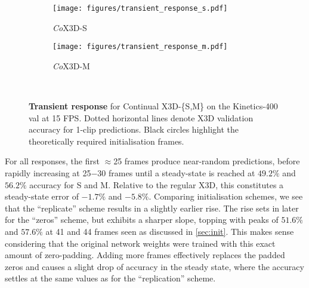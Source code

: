 \begin{figure}[b!]
    \centering
    \begin{subfigure}[b]{0.7\linewidth}
        \centering
        \texttt{[image: figures/transient\_response\_s.pdf]}
        \\[-2ex]
        \caption{\textit{Co}X3D-S}
        \label{fig:transient-s}
    \end{subfigure}
    \begin{subfigure}[b]{0.7\linewidth}
        \centering
        \texttt{[image: figures/transient\_response\_m.pdf]}
        \\[-2ex]
        \caption{\textit{Co}X3D-M}
        \label{fig:transient-m}
    \end{subfigure}
    \\[-1ex]
    \setlength{\belowcaptionskip}{-5pt}
	\caption{
	\textbf{Transient response} for Continual X3D-\{S,M\} on the Kinetics-400 val at 15 FPS.
	Dotted horizontal lines denote X3D validation accuracy for 1-clip predictions. 
	Black circles highlight the theoretically required initialisation frames.
	}
    \label{fig:transient_response_results}
    \vspace{-2mm}
\end{figure}

For all responses, the first $\approx$25 frames produce near-random predictions, before rapidly increasing at 25$-$30 frames until a steady-state is reached at $49.2\%$ and $56.2\%$ accuracy for S and M.
Relative to the regular X3D, this constitutes a steady-state error of $-1.7\%$ and $-5.8\%$.
Comparing initialisation schemes, we see that the ``replicate'' scheme results in a slightly earlier rise. %
The rise sets in later for the ``zeros'' scheme, but exhibits a sharper slope, topping with peaks of $51.6\%$ and $57.6\%$ at 41 and 44 frames seen as discussed in \cref{sec:init}.
This makes sense considering that the original network weights were trained with this exact amount of zero-padding. Adding more frames effectively replaces the padded zeros and causes a slight drop of accuracy in the steady state, where the accuracy settles at the same values as for the ``replication'' scheme. 


